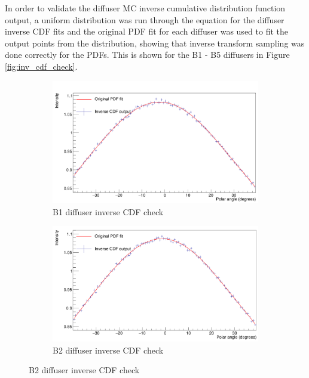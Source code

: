 In order to validate the diffuser MC inverse cumulative distribution function output, a uniform distribution was run through the equation for the diffuser inverse CDF fits and the original PDF fit for each diffuser was used to fit the output points from the distribution, showing that inverse transform sampling was done correctly for the PDFs. This is shown for the B1 - B5 diffusers in Figure \ref{fig:inv_cdf_check}. 

\begin{figure}[htp]
    \centering
    \caption{Inverse CDF checks of the B1 - B5 diffusers}
    \label{fig:inv_cdf_check}
    \begin{subfigure}{0.49\columnwidth}
    \centering
    \includegraphics[width=\textwidth]{Figures/inv_cdf_check_diff_B1.PNG}
    \caption{B1 diffuser inverse CDF check}
    \end{subfigure}\hfill
    \begin{subfigure}{0.49\columnwidth}
    \centering
    \includegraphics[width=\textwidth]{Figures/inv_cdf_check_diff_B2.PNG}
    \caption{B2 diffuser inverse CDF check}
    \end{subfigure}
    

\end{figure}
